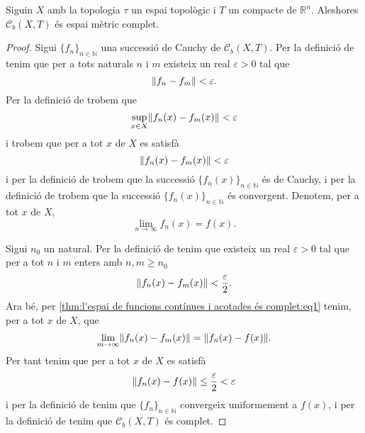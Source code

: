 \documentclass[../Apunts.tex]{subfiles}
\begin{document}
	\begin{theorem}
		\label{thm:l'espai de funcions contínues i acotades és complet}
		Siguin \(X\) amb la topologia \(\tau\) un espai topològic i \(T\) un compacte de \(\mathbb{R}^{n}\). Aleshores \(\mathcal{C}_{b}(X,T)\) és espai mètric complet.
		\begin{proof}
			Sigui \(\{f_{n}\}_{n\in\mathbb{N}}\) una successió de Cauchy de \(\mathcal{C}_{b}(X,T)\). Per la definició de  tenim que per a tots naturals \(n\) i \(m\) existeix un real \(\varepsilon>0\) tal que
			\[\norm{f_{n}-f_{m}}<\varepsilon.\]
			Per la definició de  trobem que
			\[\sup_{x\in X}\norm{f_{n}(x)-f_{m}(x)}<\varepsilon\]
			i trobem que per a tot \(x\) de \(X\) es satisfà
			\[\norm{f_{n}(x)-f_{m}(x)}<\varepsilon\]
			i per la definició de  trobem que la successió \(\{f_{n}(x)\}_{n\in\mathbb{N}}\) és de Cauchy, i per la definició de  trobem que la successió \(\{f_{n}(x)\}_{n\in\mathbb{N}}\) és convergent. Denotem, per a tot \(x\) de \(X\),
			\begin{equation}
				\label{thm:l'espai de funcions contínues i acotades és complet:eq1}
				\lim_{n\to\infty}f_{n}(x)=f(x).
			\end{equation}
			
			Sigui \(n_{0}\) un natural. Per la definició de  tenim que existeix un real \(\varepsilon>0\) tal que per a tot \(n\) i \(m\) enters amb \(n,m\geq n_{0}\)
			\[\norm{f_{n}(x)-f_{m}(x)}<\frac{\varepsilon}{2}.\]
			Ara bé, per \eqref{thm:l'espai de funcions contínues i acotades és complet:eq1} tenim, per a tot \(x\) de \(X\), que
			\[\lim_{m\to\infty}\norm{f_{n}(x)-f_{m}(x)}=\norm{f_{n}(x)-f(x)}.\]
			Per tant tenim que per a tot \(x\) de \(X\) es satisfà
			\[\norm{f_{n}(x)-f(x)}\leq\frac{\varepsilon}{2}<\varepsilon\]
			i per la definició de  tenim que \(\{f_{n}\}_{n\in\mathbb{N}}\) convergeix uniformement a \(f(x)\), i per la definició de  tenim que \(\mathcal{C}_{b}(X,T)\) és complet.
		\end{proof}
	\end{theorem}
\end{document}
